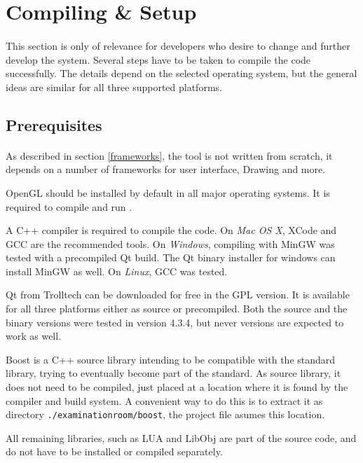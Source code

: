\section{Compiling \& Setup}
\paragraph{}
This section is only of relevance for developers who desire to change and further develop the system. Several steps have to be taken to compile the code successfully.
The details depend on the selected operating system, but the general ideas are similar for all three supported platforms.

\subsection{Prerequisites}
\paragraph{}
As described in section \ref{frameworks}, the tool is not written from scratch, it depends on a number of frameworks for user interface, Drawing and more.

OpenGL should be installed by default in all major operating systems. It is required to compile and run \ER.

A C++ compiler is required to compile the code.
On \textit{Mac OS X}, XCode and GCC are the recommended tools.
On \textit{Windows}, compiling with MinGW was tested with a precompiled Qt build.
The Qt binary installer for windows can install MinGW as well.
On \textit{Linux}, GCC was tested.

Qt from Trolltech can be downloaded for free in the GPL version\cite{qt}.
It is available for all three platforms either as source or precompiled.
Both the source and the binary versions were tested in version 4.3.4, but never versions are expected to work as well.

Boost is a C++ source library intending to be compatible with the standard library, trying to eventually become part of the standard\cite{boost}.
As source library, it does not need to be compiled, just placed at a location where it is found by the compiler and build system.
A convenient way to do this is to extract it as directory \texttt{./examinationroom/boost}, the project file asumes this location.

All remaining libraries, such as LUA and LibObj are part of the source code, and do not have to be installed or compiled separately.


